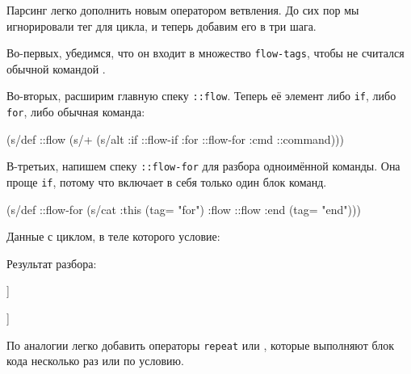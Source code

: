 Парсинг легко дополнить новым оператором ветвления. До сих пор мы игнорировали
тег  для цикла, и теперь добавим его в три шага.

Во-первых, убедимся, что он входит в множество \texttt{flow-tags}, чтобы
 не считался обычной командой .

Во-вторых, расширим главную спеку \texttt{::flow}. Теперь её элемент либо
\texttt{if}, либо \texttt{for}, либо обычная команда:

\begin{clojure}
(s/def ::flow
  (s/+
   (s/alt :if ::flow-if
          :for ::flow-for
          :cmd ::command)))
\end{clojure}

В-третьих, напишем спеку \texttt{::flow-for} для разбора одноимённой
команды. Она проще \texttt{if}, потому что включает в себя только один блок
команд.

\begin{clojure}
(s/def ::flow-for
  (s/cat :this (tag= "for")
         :flow ::flow
         :end (tag= "end")))
\end{clojure}

Данные с циклом, в теле которого условие:

\begin{clojure}
\end{clojure}

Результат разбора:

\pagebreakafive

\ifnarrow

\begin{clojure}
[[:for
  {:this {:command "for"}
   :flow
   [[:if
     {:this {:command "if" ...}
      :flow [[:cmd {:command "print" ...}]]
      :end {:command "end"}}]]
   :end {:command "end"}}]]
\end{clojure}

\else

\begin{clojure}
[[:for
  {:this {:command "for"}
   :flow
   [[:if
     {:this {:command "if" :condition "..."}
      :flow [[:cmd {:command "print" :text "hello"}]]
      :end {:command "end"}}]]
   :end {:command "end"}}]]
\end{clojure}

\fi

По аналогии легко добавить операторы \texttt{repeat} или , которые
выполняют блок кода несколько раз или по условию.

